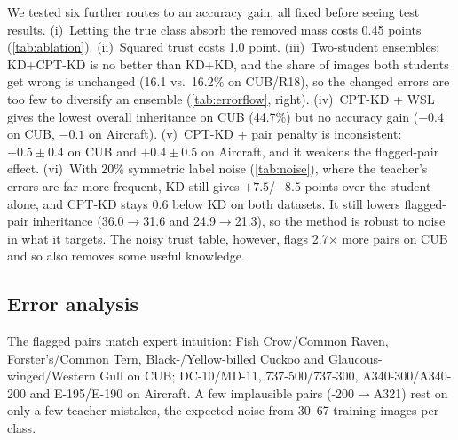\documentclass[10pt,twocolumn,letterpaper]{article}
\begin{document}
We tested six further routes to an accuracy gain, all fixed before seeing test results. (i)~Letting the true class absorb the removed mass costs 0.45 points (\cref{tab:ablation}). (ii)~Squared trust costs 1.0 point. (iii)~Two-student ensembles: KD+CPT-KD is no better than KD+KD, and the share of images both students get wrong is unchanged (16.1 vs.\ 16.2\% on CUB/R18), so the changed errors are too few to diversify an ensemble (\cref{tab:errorflow}, right). (iv)~CPT-KD + WSL gives the lowest overall inheritance on CUB (44.7\%) but no accuracy gain ($-0.4$ on CUB, $-0.1$ on Aircraft). (v)~CPT-KD + pair penalty is inconsistent: $-0.5\pm0.4$ on CUB and $+0.4\pm0.5$ on Aircraft, and it weakens the flagged-pair effect. (vi)~With 20\% symmetric label noise (\cref{tab:noise}), where the teacher's errors are far more frequent, KD still gives $+7.5$/$+8.5$ points over the student alone, and CPT-KD stays $0.6$ below KD on both datasets. It still lowers flagged-pair inheritance (36.0$\to$31.6 and 24.9$\to$21.3), so the method is robust to noise in what it targets. The noisy trust table, however, flags 2.7$\times$ more pairs on CUB and so also removes some useful knowledge.

\begin{table}[t]
\centering\footnotesize\setlength{\tabcolsep}{4pt}
\caption{\textbf{Where do the removed mistakes go?} Left/middle: on flagged test images (teacher wrong on a low-trust pair), the share the student gets right and the share it assigns to a third, wrong class (mean over 3 seeds; the rest copy the teacher). Right: accuracy of two-student ensembles (equal-weight average of two seeds).}
\label{tab:errorflow}

\end{table}

\begin{table}[t]
\centering\scriptsize
\setlength{\tabcolsep}{2.4pt}
\caption{\textbf{20\% symmetric label noise} on the training labels (test labels clean), ResNet-18, 3 seeds. Trust tables and teachers are rebuilt from the noisy labels.}
\label{tab:noise}
\resizebox{\linewidth}{!}{}
\end{table}

\subsection{Error analysis}
The flagged pairs match expert intuition: Fish Crow/Common Raven, Forster's/Common Tern, Black-/Yellow-billed Cuckoo and Glaucous-winged/Western Gull on CUB; DC-10/MD-11, 737-500/737-300, A340-300/A340-200 and E-195/E-190 on Aircraft. A few implausible pairs (-200$\to$A321) rest on only a few teacher mistakes, the expected noise from 30--67 training images per class.
\end{document}
